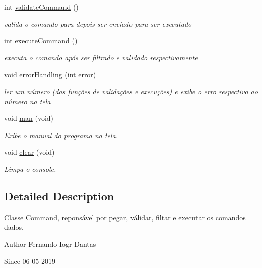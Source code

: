 \begin{DoxyCompactItemize}
int \hyperlink{classCommand_ac90a4a22d91ef08297c0aeb4368f8393}{validate\+Command} ()
\begin{DoxyCompactList}\small\item\em valida o comando para depois ser enviado para ser executado \end{DoxyCompactList}\item 
int \hyperlink{classCommand_ae9f0a3ba183b25d7824f70254df8a232}{execute\+Command} ()
\begin{DoxyCompactList}\small\item\em executa o comando após ser filtrado e validado respectivamente \end{DoxyCompactList}\item 
void \hyperlink{classCommand_adb45fb42d7bf3784bb5d9f85ea71941a}{error\+Handling} (int error)
\begin{DoxyCompactList}\small\item\em ler um número (das funções de validações e execuções) e exibe o erro respectivo ao número na tela \end{DoxyCompactList}\item 
\mbox{\label{classCommand_a1194b3db269800db66d5b2dbce154872}} 
void \hyperlink{classCommand_a1194b3db269800db66d5b2dbce154872}{man} (void)
\begin{DoxyCompactList}\small\item\em Exibe o manual do programa na tela. \end{DoxyCompactList}\item 
\mbox{\label{classCommand_af7f2f0883b59d60957a6b2bc11db755c}} 
void \hyperlink{classCommand_af7f2f0883b59d60957a6b2bc11db755c}{clear} (void)
\begin{DoxyCompactList}\small\item\em Limpa o console. \end{DoxyCompactList}\end{DoxyCompactItemize}


\subsection{Detailed Description}
Classe \hyperlink{classCommand}{Command}, reponsável por pegar, válidar, filtar e executar os comandos dados. 

\begin{DoxyAuthor}{Author}
Fernando Iogr Dantas
\end{DoxyAuthor}
\begin{DoxySince}{Since}
06-\/05-\/2019 
\end{DoxySince}


